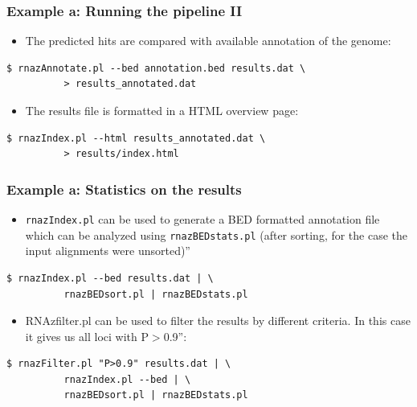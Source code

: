 \documentclass[a4paper]{article}
\newcommand{\frametitle}[1]{\subsubsection{#1}}
\begin{document}


 \frametitle{Example a: Running the pipeline II}

\begin{itemize}
  \item The predicted hits are compared with available annotation of the genome:
  \end{itemize}
\small
\begin{verbatim}
$ rnazAnnotate.pl --bed annotation.bed results.dat \
          > results_annotated.dat
\end{verbatim}
\normalsize
\begin{itemize}
  \item The results file is formatted in a HTML overview page:
  \end{itemize}
\small
\begin{verbatim}
$ rnazIndex.pl --html results_annotated.dat \
          > results/index.html
\end{verbatim}
\normalsize



  \frametitle{Example a: Statistics on the results}

\begin{itemize}
\item \texttt{rnazIndex.pl} can be used to generate a BED formatted
  annotation file which can be analyzed using \texttt{rnazBEDstats.pl}
  (after sorting, for the case the input alignments were unsorted)''
\end{itemize}

\small
\begin{verbatim}
$ rnazIndex.pl --bed results.dat | \
          rnazBEDsort.pl | rnazBEDstats.pl
\end{verbatim}
\normalsize

\begin{itemize}
\item RNAzfilter.pl can be used to filter the results by different
  criteria. In this case it gives us all loci with P$>$0.9'':
\end{itemize}

\small
\begin{verbatim}
$ rnazFilter.pl "P>0.9" results.dat | \
          rnazIndex.pl --bed | \
          rnazBEDsort.pl | rnazBEDstats.pl
\end{verbatim}
\normalsize
\end{document}
